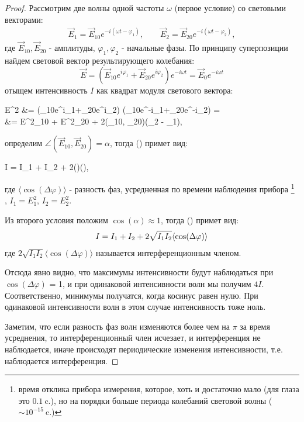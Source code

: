 ﻿\documentclass[__main__.tex]{subfiles}
\begin{document}
\begin{proof}
	Рассмотрим две волны одной частоты $\omega$ (первое условие) со световыми векторами:
	\begin{gather*}
	\vec{E}_1 = \vec{E}_{10}e^{-i(\omega t - \varphi_1)},\qquad
	\vec{E}_2 = \vec{E}_{20}e^{-i(\omega t - \varphi_2)},
	\end{gather*}
	где $\vec{E}_{10}, \vec{E}_{20}$ - амплитуды, $\varphi_1, \varphi_2$ - начальные фазы.
	По принципу суперпозиции найдем световой вектор результирующего колебания:
	$$
	\vec{E} = \left(\vec{E}_{10}e^{i\varphi_1}+\vec{E}_{20}e^{i\varphi_2}\right)e^{-i\omega t} =
	\vec{E}_0 e^{-i \omega t}
	$$
	отыщем интенсивность $I$ как квадрат модуля светового вектора:
	\begin{flalign}
	\begin{split}
	E^2 &= \left(_{10}e^{i\varphi_1}+_{20}e^{i\varphi_2}\right)
	\left(_{10}e^{-i\varphi_1}+_{20}e^{-i\varphi_2}\right) =\\
	&= E^2_{10} + E^2_{20} + 2(_{10}, _{20})\cos(\varphi_2 - \varphi_1),
	\end{split}
	\end{flalign}
	
	определим $\angle(\vec{E}_{10},\vec{E}_20) = \alpha$, тогда () примет вид:
	\begin{flalign}
	\llabel{o-02-alpha}
	I = I_1 + I_2 + 2\cos(\alpha)\langle\cos(\Delta \varphi)\rangle,
	\end{flalign}
	где $\langle\cos(\Delta \varphi)\rangle$ - разность фаз, усредненная по времени наблюдения прибора
	\footnote{
		время отклика прибора измерения, которое, хоть и достаточно мало (для глаза это $0.1~\text{c.}$), но на порядки больше периода колебаний световой волны ($\sim 10^{-15}~\text{c.}$)
	}
	, $I_1 = E_1^2$, $I_2 = E_2^2$.
	
	Из второго условия положим $\cos(\alpha)\approx 1$, тогда () примет вид:
	\begin{gather}
	\llabel{o-02-mainint}
	I = I_1 + I_2 + 2\sqrt{I_1 I_2}\langle\cos(\Delta \varphi)\rangle
	\end{gather}
	где $2\sqrt{I_1 I_2}\langle\cos(\Delta \varphi)\rangle$ называется интерференционным членом.
	
	Отсюда явно видно, что максимумы интенсивности будут наблюдаться при $\cos(\Delta \varphi)$ = 1, и при одинаковой интенсивности волн мы получим $4I$.
	Соответственно, минимумы получатся, когда косинус равен нулю. При одинаковой интенсивности волн в этом случае интенсивность тоже ноль.
	
	Заметим, что если разность фаз волн изменяются более чем на $\pi$ за время усреднения, то интерференционный член исчезает, и интерференция не наблюдается, иначе происходят периодические изменения интенсивности, т.е. наблюдается интерференция.
\end{proof}
\end{document}
